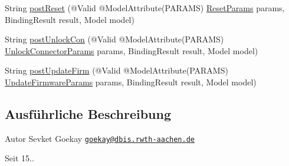 \begin{DoxyCompactItemize}
\item 
String \hyperlink{classde_1_1rwth_1_1idsg_1_1steve_1_1web_1_1controller_1_1_ocpp12_controller_a530af2ab671e7b38ae1d52ab7667184c}{post\-Reset} (@Valid @Model\-Attribute(P\-A\-R\-A\-M\-S) \hyperlink{classde_1_1rwth_1_1idsg_1_1steve_1_1web_1_1dto_1_1ocpp12_1_1_reset_params}{Reset\-Params} params, Binding\-Result result, Model model)
\item 
String \hyperlink{classde_1_1rwth_1_1idsg_1_1steve_1_1web_1_1controller_1_1_ocpp12_controller_a87f0422e37e5e8d59d151f9ee6ab06f6}{post\-Unlock\-Con} (@Valid @Model\-Attribute(P\-A\-R\-A\-M\-S) \hyperlink{classde_1_1rwth_1_1idsg_1_1steve_1_1web_1_1dto_1_1common_1_1_unlock_connector_params}{Unlock\-Connector\-Params} params, Binding\-Result result, Model model)
\item 
String \hyperlink{classde_1_1rwth_1_1idsg_1_1steve_1_1web_1_1controller_1_1_ocpp12_controller_a2bf86abb9b2190f0a7ff211e9a29e7dd}{post\-Update\-Firm} (@Valid @Model\-Attribute(P\-A\-R\-A\-M\-S) \hyperlink{classde_1_1rwth_1_1idsg_1_1steve_1_1web_1_1dto_1_1common_1_1_update_firmware_params}{Update\-Firmware\-Params} params, Binding\-Result result, Model model)
\end{DoxyCompactItemize}


\subsection{Ausführliche Beschreibung}
\begin{DoxyAuthor}{Autor}
Sevket Goekay \href{mailto:goekay@dbis.rwth-aachen.de}{\tt goekay@dbis.\-rwth-\/aachen.\-de} 
\end{DoxyAuthor}
\begin{DoxySince}{Seit}
15.. 
\end{DoxySince}


